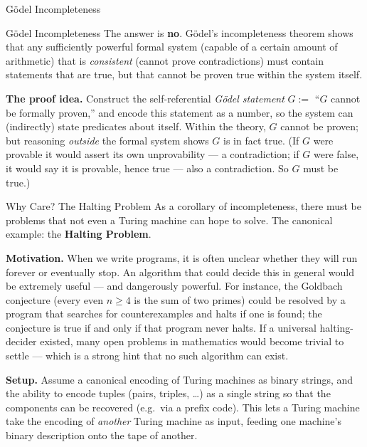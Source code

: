\documentclass[aspectratio=169,10pt]{beamer}
\begin{document}
\begin{frame}{G\"odel Incompleteness}
  \begin{block}{Gödel Incompleteness}
    The answer is \textbf{no}. Gödel's incompleteness theorem shows that any
    sufficiently powerful formal system (capable of a certain amount of
    arithmetic) that is \emph{consistent} (cannot prove contradictions) must
    contain statements that are true, but that cannot be proven true within
    the system itself.
  \end{block}

  \textbf{The proof idea.} Construct the self-referential
  \emph{Gödel statement} $G := $ ``$G$ cannot be formally proven,'' and encode
  this statement as a number, so the system can (indirectly) state predicates
  about itself. Within the theory, $G$ cannot be proven; but reasoning
  \emph{outside} the formal system shows $G$ is in fact true. (If $G$ were
  provable it would assert its own unprovability --- a contradiction; if $G$
  were false, it would say it is provable, hence true --- also a
  contradiction. So $G$ must be true.)
\end{frame}

\begin{frame}{Why Care? The Halting Problem}
  As a corollary of incompleteness, there must be problems that not even a
  Turing machine can hope to solve. The canonical example: the
  \textbf{Halting Problem}.

  \textbf{Motivation.} When we write programs, it is often unclear whether
  they will run forever or eventually stop. An algorithm that could decide
  this in general would be extremely useful --- and dangerously powerful. For
  instance, the Goldbach conjecture (every even $n \geq 4$ is the sum of two
  primes) could be resolved by a program that searches for counterexamples and
  halts if one is found; the conjecture is true if and only if that program
  never halts. If a universal halting-decider existed, many open problems in
  mathematics would become trivial to settle --- which is a strong hint that
  no such algorithm can exist.

  \vspace{2mm}
  \textbf{Setup.} Assume a canonical encoding of Turing machines as binary
  strings, and the ability to encode tuples (pairs, triples, \dots) as a
  single string so that the components can be recovered (e.g.\ via a prefix
  code). This lets a Turing machine take the encoding of \emph{another} Turing
  machine as input, feeding one machine's binary description onto the tape of
  another.
\end{frame}
\end{document}
